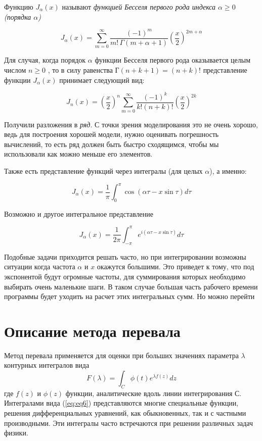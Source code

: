 \documentclass[14pt]{extarticle}
\begin{document}
Функцию $J_\alpha(x)$ называют \textit{функцией Бесселя первого рода индекса $\alpha \ge 0$ (порядка  $\alpha$)}

$$
	J_\alpha(x) = \sum_{m=0}^\infty \frac{(-1)^m}{m!\, \Gamma(m+\alpha+1)} {\left({\frac{x}{2}}\right)}^{2m+\alpha} 
$$

Для случая, когда порядок $\alpha$ функции Бесселя первого рода оказывается целым числом $n \ge 0$ , то в силу равенства $Г(n+k+1)=(n+k)!$ представление функции $J_\alpha(x)$ принимает следующий вид:

$$
J_n(x)=\left(\frac{x}{2}\right)^n\sum_{m=0}^{\infty}\frac{(-1)^k}{k! (n+k)!}{\left(\frac{x}{2}\right)}^{2k}
$$

Получили разложения в \textit{ряд}. С точки зрения моделирования это не очень хорошо, ведь для построения хорошей модели, нужно оценивать погрешность вычислений, то есть ряд должен быть быстро сходящимся, чтобы мы использовали как можно меньше его элементов. 

Также есть представление функций через интегралы (для целых $\alpha$), а именно:

$$
J_\alpha(x)=\frac{1}{\pi}\int_{0}^{\pi}\cos(\alpha\tau-x\sin\tau)d\tau
$$

Возможно и другое интегральное представление\cite{Fedoryuk}

\begin{equation}\label{eq:eq5}
J_\alpha(x)=\frac{1}{2\pi}\int_{-\pi}^{\pi}e^{i(\alpha\tau-x\sin\tau)}d\tau
\end{equation} 
  
Подобные задачи приходится решать часто, но при интегрировании возможны ситуации когда частота $\alpha$ и $x$ окажутся большими. Это приведет к тому, что под экспонентой будут огромные частоты, для суммирования которых необходимо выбирать очень маленькие шаги. В таком случае большая часть рабочего времени программы будет уходить на расчет этих интегральных сумм. Но можно перейти 

\section{Описание метода перевала} 

Метод перевала применяется для оценки при больших значениях параметра $\lambda$ контурных интегралов вида
\begin{equation}\label{eq:eq6}
F(\lambda) = \int_{C}^{}\phi(t)e^{\lambda f(z)}dz
\end{equation} 
где $f(z)$ и $\phi(z)$ функции, аналитические вдоль линии интегрирования С. Интегралами вида (\ref{eq:eq6}) представляются многие специальные функции, решения дифференциальных уравнений, как обыкновенных, так и с частными производными. Эти интегралы часто встречаются при решении различных задач физики.
\end{document}
